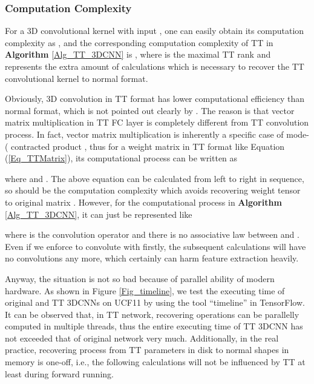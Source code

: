 \documentclass[a4paper,fleqn]{cas-dc}
\begin{document}
\subsubsection{Computation Complexity}\quad

\begin{figure*}
\centering
{}
\caption{\textbf{Forward executing time of the two stream 3DCNN on UCF11.} These figures are made by the tool ``timeline'' in TensorFlow and run on CPU with 20 batch size. For clarity, ``enisum'' function in t3f is replaced by normal transposition and matrix multiplication, and BN is also disabled.}
\label{Fig_timeline}
\end{figure*}

For a 3D convolutional kernel  with input , one can easily obtain its computation complexity as , and the corresponding computation complexity of TT in \textbf{Algorithm} \ref{Alg_TT_3DCNN} is , where  is the maximal TT rank and  represents the extra amount of calculations which is necessary to recover the TT convolutional kernel to normal format.

Obviously, 3D convolution in TT format has lower computational efficiency than normal format, which is not pointed out clearly by \citet{Garipov_2016_TTCNN}. The reason is that vector matrix multiplication in TT FC layer is completely different from TT convolution process. In fact, vector matrix multiplication is inherently a specific case of mode-( contracted product \citep{Lee_2018_TensorNetwork}, thus for a weight matrix in TT format like Equation (\ref{Eq_TTMatrix}), its computational process can be written as

where  and . The above equation can be calculated from left to right in sequence, so  should be the computation complexity which avoids recovering weight tensor to original matrix \citep{Novikov_2015_TT}. However, for the computational process in \textbf{Algorithm} \ref{Alg_TT_3DCNN}, it can just be represented like

where  is the convolution operator and there is no associative law between  and . Even if we enforce  to convolute with  firstly, the subsequent calculations will have no convolutions any more, which certainly can harm feature extraction heavily.

Anyway, the situation is not so bad because of parallel ability of modern hardware. As shown in Figure \ref{Fig_timeline}, we test the executing time of original and TT 3DCNNs on UCF11 by using the tool ``timeline'' in TensorFlow. It can be observed that, in TT network, recovering operations can be parallelly computed in multiple threads, thus the entire executing time of TT 3DCNN has not exceeded that of original network very much. Additionally, in the real practice, recovering process from TT parameters in disk to normal shapes in memory is one-off, i.e., the following calculations will not be influenced by TT at least during forward running.
\end{document}
